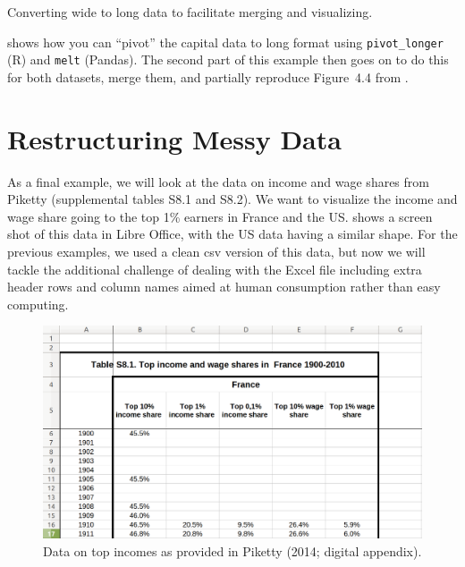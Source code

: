 \begin{ccsexample}
  \begin{tcolorbox}[title=Output]
    \texttt{[image: \{snippets/chapter06/merge2.r]}.png}
  \end{tcolorbox}
  \caption{Converting wide to long data to facilitate merging and visualizing.}\label{ex:merge2}
\end{ccsexample}

 shows how you can ``pivot'' the capital data to long format using \texttt{pivot\_longer} (R) and \texttt{melt} (Pandas). The second part of this example then goes on to do this for both datasets, merge them, and partially reproduce Figure~4.4 from \citet{piketty}.

\section{Restructuring Messy Data}

As a final example, we will look at the data on income and wage shares from Piketty (supplemental tables S8.1 and S8.2).
We want to visualize the income and wage share going to the top 1\% earners in France and the US.
 shows a screen shot of this data in Libre Office, with the US data having a similar shape.
For the previous examples, we used a clean csv version of this data, but now we will tackle the additional challenge
of dealing with the Excel file including extra header rows and column names aimed at human consumption rather than easy computing.

\begin{figure}
  \includegraphics[width=\linewidth]{chapter06/messy.png}
  \caption{Data on top incomes as provided in Piketty (2014; digital appendix).}\label{fig:messy}
\end{figure}

